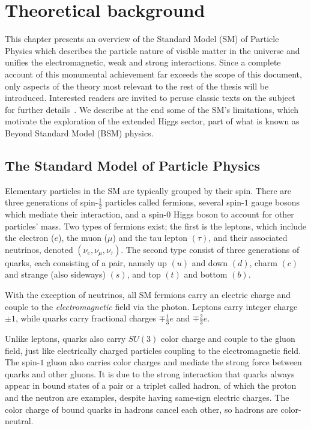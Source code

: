 \chapter{Theoretical background}
\label{chap:theory}

This chapter presents an overview of the Standard Model (SM) of Particle Physics which describes the particle nature of visible matter in the universe and unifies the electromagnetic, weak and strong interactions. 
Since a complete account of this monumental achievement far exceeds the scope of this document, only aspects of the theory most relevant to the rest of the thesis will be introduced. 
Interested readers are invited to peruse classic texts on the subject for further details~\cite{Peskin_2018, Halzen_Martin_2016, Schwartz_2014}.
We describe at the end some of the SM's limitations, which motivate the exploration of the extended Higgs sector, part of what is known as Beyond Standard Model (BSM) physics.

\section{The Standard Model of Particle Physics}

Elementary particles in the SM are typically grouped by their spin. 
There are three generations of spin-$\frac{1}{2}$ particles called fermions, several spin-$1$ gauge bosons which mediate their interaction, and a spin-$0$ Higgs boson to account for other particles' mass. 
Two types of fermions exist; the first is the leptons, which include the electron ($e$), the muon ($\mu$) and the tau lepton $(\tau)$, and their associated neutrinos, denoted $(\nu_e, \nu_{\mu}, \nu_{\tau})$. 
The second type consist of three generations of quarks, each consisting of a pair, namely up $(u)$ and down $(d)$, charm $(c)$ and strange (also sideways) $(s)$, and top $(t)$ and bottom $(b)$. 

With the exception of neutrinos, all SM fermions carry an electric charge and couple to the \textit{electromagnetic} field via the photon. Leptons carry integer charge $\pm1$, while quarks carry fractional charges $\mp\frac{1}{3}e$ and $\mp\frac{2}{3}e$. 

Unlike leptons, quarks also carry $SU(3)$ color charge and couple to the gluon field, just like electrically charged particles coupling to the electromagnetic field. 
The spin-$1$ gluon also carries color charges and mediate the strong force between quarks and other gluons. 
It is due to the strong interaction that quarks always appear in bound states of a pair or a triplet called hadron, of which the proton and the neutron are examples, despite having same-sign electric charges. 
The color charge of bound quarks in hadrons cancel each other, so hadrons are color-neutral. 

